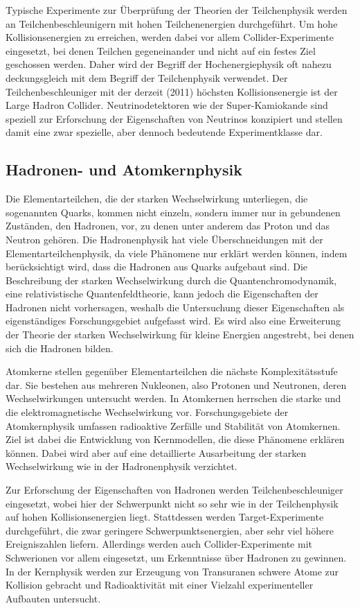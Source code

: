 \documentclass[titlepage, parkskip=full, twocolumn, landscape]{scrartcl}
\begin{document}
Typische Experimente zur Überprüfung der Theorien der Teilchenphysik werden an Teilchenbeschleunigern mit hohen Teilchenenergien durchgeführt. Um hohe Kollisionsenergien zu erreichen, werden dabei vor allem Collider-Experimente eingesetzt, bei denen Teilchen gegeneinander und nicht auf ein festes Ziel geschossen werden. Daher wird der Begriff der Hochenergiephysik oft nahezu deckungsgleich mit dem Begriff der Teilchenphysik verwendet. Der Teilchenbeschleuniger mit der derzeit (2011) höchsten Kollisionsenergie ist der Large Hadron Collider. Neutrinodetektoren wie der Super-Kamiokande sind speziell zur Erforschung der Eigenschaften von Neutrinos konzipiert und stellen damit eine zwar spezielle, aber dennoch bedeutende Experimentklasse dar.

\subsection{Hadronen- und Atomkernphysik}

Die Elementarteilchen, die der starken Wechselwirkung unterliegen, die sogenannten Quarks, kommen nicht einzeln, sondern immer nur in gebundenen Zuständen, den Hadronen, vor, zu denen unter anderem das Proton und das Neutron gehören. Die Hadronenphysik hat viele Überschneidungen mit der Elementarteilchenphysik, da viele Phänomene nur erklärt werden können, indem berücksichtigt wird, dass die Hadronen aus Quarks aufgebaut sind. Die Beschreibung der starken Wechselwirkung durch die Quantenchromodynamik, eine relativistische Quantenfeldtheorie, kann jedoch die Eigenschaften der Hadronen nicht vorhersagen, weshalb die Untersuchung dieser Eigenschaften als eigenständiges Forschungsgebiet aufgefasst wird. Es wird also eine Erweiterung der Theorie der starken Wechselwirkung für kleine Energien angestrebt, bei denen sich die Hadronen bilden.

Atomkerne stellen gegenüber Elementarteilchen die nächste Komplexitätsstufe dar. Sie bestehen aus mehreren Nukleonen, also Protonen und Neutronen, deren Wechselwirkungen untersucht werden. In Atomkernen herrschen die starke und die elektromagnetische Wechselwirkung vor. Forschungsgebiete der Atomkernphysik umfassen radioaktive Zerfälle und Stabilität von Atomkernen. Ziel ist dabei die Entwicklung von Kernmodellen, die diese Phänomene erklären können. Dabei wird aber auf eine detaillierte Ausarbeitung der starken Wechselwirkung wie in der Hadronenphysik verzichtet.

Zur Erforschung der Eigenschaften von Hadronen werden Teilchenbeschleuniger eingesetzt, wobei hier der Schwerpunkt nicht so sehr wie in der Teilchenphysik auf hohen Kollisionsenergien liegt. Stattdessen werden Target-Experimente durchgeführt, die zwar geringere Schwerpunktsenergien, aber sehr viel höhere Ereigniszahlen liefern. Allerdings werden auch Collider-Experimente mit Schwerionen vor allem eingesetzt, um Erkenntnisse über Hadronen zu gewinnen. In der Kernphysik werden zur Erzeugung von Transuranen schwere Atome zur Kollision gebracht und Radioaktivität mit einer Vielzahl experimenteller Aufbauten untersucht.
\end{document}
